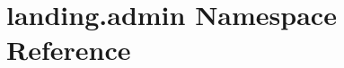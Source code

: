 \hypertarget{namespacelanding_1_1admin}{}\section{landing.\+admin Namespace Reference}
\label{namespacelanding_1_1admin}

